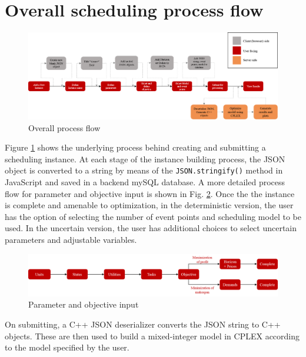 \section{Overall scheduling process flow}
\begin{figure}[htbp]
\centering
\includegraphics[width=\linewidth]{Images/Communication.png}
\caption{Overall process flow}
\label{fig:Communication}
\end{figure}

Figure \ref{fig:Communication} shows the underlying process behind creating and submitting a scheduling instance. At each stage of the instance building process, the JSON object is converted to a string by means of the \texttt{JSON.stringify()} method in JavaScript and saved in a backend mySQL database. A more detailed process flow for parameter and objective input is shown in Fig. \ref{fig:paraminput}. Once the the instance is complete and amenable to optimization, in the deterministic version, the user has the option of selecting the number of event points and scheduling model to be used. In the uncertain version, the user has additional choices to select uncertain parameters and adjustable variables.

\begin{figure}[htbp]
\centering
\includegraphics[width=\linewidth]{Images/ParameterObjectiveInput.png}
\caption{Parameter and objective input}
\label{fig:paraminput}
\end{figure}

On submitting, a C++ JSON deserializer converts the JSON string to C++ objects. These are then used to build a mixed-integer model in CPLEX according to the model specified by the user.

